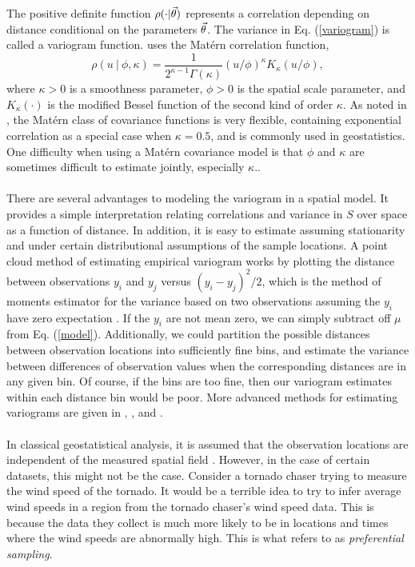 \documentclass{uwstat572}
\begin{document}
The positive definite function $\rho(\cdot  \vert \vec{\theta})$ represents a correlation depending on distance conditional on the parameters $\vec{\theta}$.  The variance in Eq. (\ref{variogram}) is called a variogram function.  \citet{diggle2010} uses the Mat\'{e}rn correlation function,
$$ \rho(u \ \vert \ \phi, \kappa) = \frac{1}{2^{\kappa - 1} \Gamma(\kappa)} (u/\phi)^{\kappa} K_\kappa(u/\phi), $$
where $\kappa > 0$ is a smoothness parameter, $\phi > 0$ is the spatial scale parameter, and $K_\kappa(\cdot)$ is the modified Bessel function of the second kind of order $\kappa$.  As noted in \citet{diggle2010}, the Mat\'{e}rn class of covariance functions is very flexible, containing exponential correlation as a special case when $\kappa = 0.5$, and is commonly used in geostatistics.  One difficulty when using a Mat\'{e}rn covariance model is that $\phi$ and $\kappa$ are sometimes difficult to estimate jointly, especially $\kappa$.\citep{diggle2010}.
\\\\
There are several advantages to modeling the variogram in a spatial model.  It provides a simple interpretation relating correlations and variance in $S$ over space as a function of distance.  In addition, it is easy to estimate assuming stationarity and under certain distributional assumptions of the sample locations.  A point cloud method of estimating empirical variogram works by plotting the distance between observations $y_i$ and $y_j$ versus $(y_i - y_j)^2/2$, which is the method of moments estimator for the variance based on two observations assuming the $y_i$ have zero expectation \citep{diggle2010}.  If the $y_i$ are not mean zero, we can simply subtract off $\mu$ from Eq. (\ref{model}).  Additionally, we could partition the possible distances between observation locations into sufficiently fine bins, and estimate the variance between differences of observation values when the corresponding distances are in any given bin.  Of course, if the bins are too fine, then our variogram estimates within each distance bin would be poor.  More advanced methods for estimating variograms are given in \citet[section 2.2]{chiles1999}, \citet{cressie1985}, and \citet[section 2.4]{cressie1991}.
\\\\
In classical geostatistical analysis, it is assumed that the observation locations are independent of the measured spatial field \citep{diggle2010}.  However, in the case of certain datasets, this might not be the case.  Consider a tornado chaser trying to measure the wind speed of the tornado.  It would be a terrible idea to try to infer average wind speeds in a region from the tornado chaser's wind speed data.  This is because the data they collect is much more likely to be in locations and times where the wind speeds are abnormally high.  This is what \citet{diggle2010} refers to as \emph{preferential sampling}.
\end{document}

